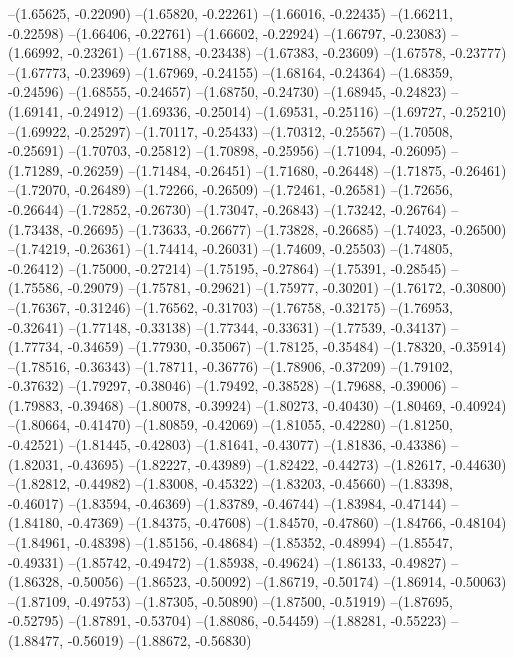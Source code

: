 --(1.65625, -0.22090)
--(1.65820, -0.22261)
--(1.66016, -0.22435)
--(1.66211, -0.22598)
--(1.66406, -0.22761)
--(1.66602, -0.22924)
--(1.66797, -0.23083)
--(1.66992, -0.23261)
--(1.67188, -0.23438)
--(1.67383, -0.23609)
--(1.67578, -0.23777)
--(1.67773, -0.23969)
--(1.67969, -0.24155)
--(1.68164, -0.24364)
--(1.68359, -0.24596)
--(1.68555, -0.24657)
--(1.68750, -0.24730)
--(1.68945, -0.24823)
--(1.69141, -0.24912)
--(1.69336, -0.25014)
--(1.69531, -0.25116)
--(1.69727, -0.25210)
--(1.69922, -0.25297)
--(1.70117, -0.25433)
--(1.70312, -0.25567)
--(1.70508, -0.25691)
--(1.70703, -0.25812)
--(1.70898, -0.25956)
--(1.71094, -0.26095)
--(1.71289, -0.26259)
--(1.71484, -0.26451)
--(1.71680, -0.26448)
--(1.71875, -0.26461)
--(1.72070, -0.26489)
--(1.72266, -0.26509)
--(1.72461, -0.26581)
--(1.72656, -0.26644)
--(1.72852, -0.26730)
--(1.73047, -0.26843)
--(1.73242, -0.26764)
--(1.73438, -0.26695)
--(1.73633, -0.26677)
--(1.73828, -0.26685)
--(1.74023, -0.26500)
--(1.74219, -0.26361)
--(1.74414, -0.26031)
--(1.74609, -0.25503)
--(1.74805, -0.26412)
--(1.75000, -0.27214)
--(1.75195, -0.27864)
--(1.75391, -0.28545)
--(1.75586, -0.29079)
--(1.75781, -0.29621)
--(1.75977, -0.30201)
--(1.76172, -0.30800)
--(1.76367, -0.31246)
--(1.76562, -0.31703)
--(1.76758, -0.32175)
--(1.76953, -0.32641)
--(1.77148, -0.33138)
--(1.77344, -0.33631)
--(1.77539, -0.34137)
--(1.77734, -0.34659)
--(1.77930, -0.35067)
--(1.78125, -0.35484)
--(1.78320, -0.35914)
--(1.78516, -0.36343)
--(1.78711, -0.36776)
--(1.78906, -0.37209)
--(1.79102, -0.37632)
--(1.79297, -0.38046)
--(1.79492, -0.38528)
--(1.79688, -0.39006)
--(1.79883, -0.39468)
--(1.80078, -0.39924)
--(1.80273, -0.40430)
--(1.80469, -0.40924)
--(1.80664, -0.41470)
--(1.80859, -0.42069)
--(1.81055, -0.42280)
--(1.81250, -0.42521)
--(1.81445, -0.42803)
--(1.81641, -0.43077)
--(1.81836, -0.43386)
--(1.82031, -0.43695)
--(1.82227, -0.43989)
--(1.82422, -0.44273)
--(1.82617, -0.44630)
--(1.82812, -0.44982)
--(1.83008, -0.45322)
--(1.83203, -0.45660)
--(1.83398, -0.46017)
--(1.83594, -0.46369)
--(1.83789, -0.46744)
--(1.83984, -0.47144)
--(1.84180, -0.47369)
--(1.84375, -0.47608)
--(1.84570, -0.47860)
--(1.84766, -0.48104)
--(1.84961, -0.48398)
--(1.85156, -0.48684)
--(1.85352, -0.48994)
--(1.85547, -0.49331)
--(1.85742, -0.49472)
--(1.85938, -0.49624)
--(1.86133, -0.49827)
--(1.86328, -0.50056)
--(1.86523, -0.50092)
--(1.86719, -0.50174)
--(1.86914, -0.50063)
--(1.87109, -0.49753)
--(1.87305, -0.50890)
--(1.87500, -0.51919)
--(1.87695, -0.52795)
--(1.87891, -0.53704)
--(1.88086, -0.54459)
--(1.88281, -0.55223)
--(1.88477, -0.56019)
--(1.88672, -0.56830)
